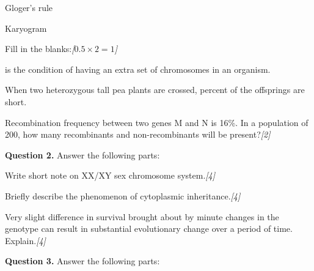\documentclass[11pt,a4paper]{article}
\newcommand{\pts}[1]{\hfill   \textit{[#1]}}
\begin{document}
\begin{parts}
\begin{parts}
    \item Gloger's rule
    \item Karyogram
  \end{parts}

  \item Fill in the blanks:\pts{$0.5  \times 2 = 1$}
  
\begin{parts}
    \item \underline{\hspace{3cm}} is the condition of having an extra set of chromosomes in an organism.
    \item When two heterozygous tall pea plants are crossed, \underline{\hspace{2cm}} percent of the offsprings are short.
  \end{parts}

  \item Recombination frequency between two genes M and N is 16\%. In a population of 200, how many recombinants and non-recombinants will be present?\pts{2}
\end{parts}

\medskip


\noindent   \textbf{Question 2.} Answer the following parts:

\begin{parts}
  \item Write short note on XX/XY sex chromosome system.\pts{4}
  \item Briefly describe the phenomenon of cytoplasmic inheritance.\pts{4}
  \item Very slight difference in survival brought about by minute changes in the genotype can result in substantial evolutionary change over a period of time. Explain.\pts{4}
\end{parts}

\medskip


\noindent   \textbf{Question 3.} Answer the following parts:
\end{document}
